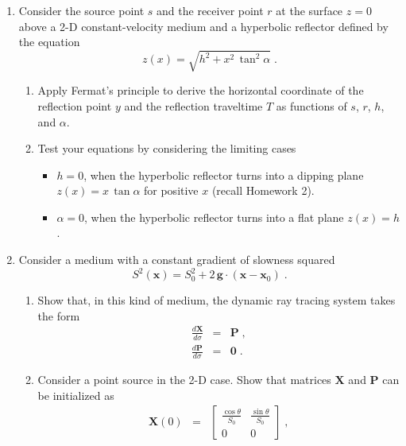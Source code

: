 \begin{enumerate}
\item Consider the source point $s$ and the receiver point $r$ at the
  surface $z=0$ above a 2-D constant-velocity medium and a hyperbolic
  reflector defined by the equation 
  \begin{equation}
    \label{eq:hyper}
    z(x) = \sqrt{h^2 +
      x^2\,\tan^2{\alpha}}\;.
  \end{equation}
  \begin{enumerate}
  \item Apply Fermat's principle to derive the horizontal coordinate of
    the reflection point $y$ and the reflection traveltime $T$ as 
    functions of $s$, $r$, $h$, and $\alpha$.
  \item Test your equations by considering the limiting cases
    \begin{itemize}
    \item $h=0$, 
      when the hyperbolic reflector turns into a dipping 
      plane $z(x)= x\,\tan{\alpha}$ for positive $x$ (recall Homework 2).
    \item $\alpha=0$,
      when the
      hyperbolic reflector turns into a flat plane $z(x)=h$.
    \end{itemize}
  \end{enumerate}
\item Consider a medium with a constant gradient of slowness squared
  \begin{equation}
    S^2(\mathbf{x}) = S_0^2 + 2\,\mathbf{g} \cdot (\mathbf{x}-\mathbf{x}_0)\;.
  \end{equation}
  \begin{enumerate}
  \item Show that, in this kind of medium, the dynamic ray tracing system
    takes the form
  \begin{eqnarray}
    \label{eq:dxds}
    {\frac{d \mathbf{X}}{d \sigma}} & = & \mathbf{P}\;, \\
    {\frac{d \mathbf{P}}{d \sigma}} & = & \mathbf{0}\;.
    \label{eq:dpds}
  \end{eqnarray}
\item Consider a point source in the 2-D case. Show that matrices
  $\mathbf{X}$ and $\mathbf{P}$ can be initialized as
  \begin{eqnarray}
    \label{eq:x0}
    \mathbf{X}(0) & = & \left[\begin{array}{cc} 
        \frac{\cos \theta}{S_0} & \frac{\sin \theta}{S_0} \\
        0 & 0 \end{array}\right]\;, \\

\end{eqnarray}
\end{enumerate}
\end{enumerate}
